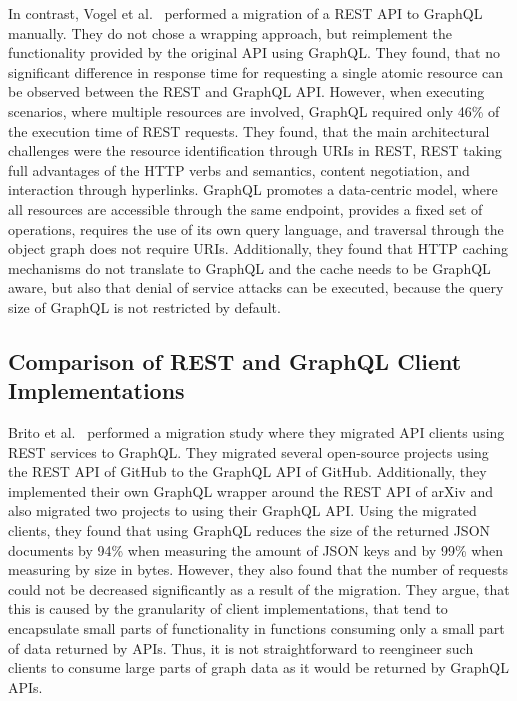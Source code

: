 In contrast, Vogel et al.~\cite{Vogel2017} performed a migration of a \ac{REST} \ac{API} to GraphQL manually.
They do not chose a wrapping approach, but reimplement the functionality provided by the original \ac{API} using GraphQL.
They found, that no significant difference in response time for requesting a single atomic resource can be observed between the \ac{REST} and GraphQL \ac{API}.
However, when executing scenarios, where multiple resources are involved, GraphQL required only 46\% of the execution time of \ac{REST} requests.
They found, that the main architectural challenges were the resource identification through \acp{URI} in \ac{REST}, \ac{REST} taking full advantages of the \ac{HTTP} verbs and semantics, content negotiation, and interaction through hyperlinks.
GraphQL promotes a data-centric model, where all resources are accessible through the same endpoint, provides a fixed set of operations, requires the use of its own query language, and traversal through the object graph does not require \acp{URI}.
Additionally, they found that \ac{HTTP} caching mechanisms do not translate to GraphQL and the cache needs to be GraphQL aware, but also that denial of service attacks can be executed, because the query size of GraphQL is not restricted by default.

\subsection{Comparison of \acs{REST} and GraphQL Client Implementations}\label{sec:rel-3}

Brito et al.~\cite{Brito2019} performed a migration study where they migrated \ac{API} clients using \ac{REST} services to GraphQL.
They migrated several open-source projects using the \ac{REST} \ac{API} of GitHub to the GraphQL \ac{API} of GitHub.
Additionally, they implemented their own GraphQL wrapper around the \ac{REST} \ac{API} of arXiv and also migrated two projects to using their GraphQL \ac{API}.
Using the migrated clients, they found that using GraphQL reduces the size of the returned \ac{JSON} documents by 94\% when measuring the amount of \ac{JSON} keys and by 99\% when measuring by size in bytes.
However, they also found that the number of requests could not be decreased significantly as a result of the migration.
They argue, that this is caused by the granularity of client implementations, that tend to encapsulate small parts of functionality in functions consuming only a small part of data returned by \acp{API}.
Thus, it is not straightforward to reengineer such clients to consume large parts of graph data as it would be returned by GraphQL \acp{API}.

